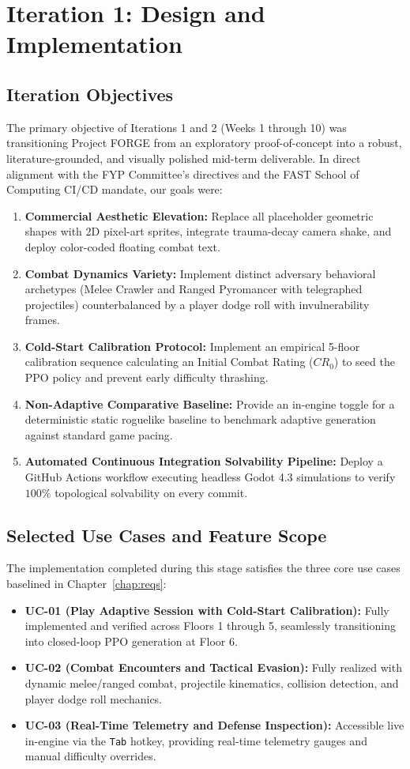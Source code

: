 \chapter{Iteration 1: Design and Implementation}
\label{chap:iter1}

\section{Iteration Objectives}
The primary objective of Iterations 1 and 2 (Weeks 1 through 10) was transitioning Project FORGE from an exploratory proof-of-concept into a robust, literature-grounded, and visually polished mid-term deliverable. In direct alignment with the FYP Committee's directives and the FAST School of Computing CI/CD mandate, our goals were:
\begin{enumerate}
    \item \textbf{Commercial Aesthetic Elevation:} Replace all placeholder geometric shapes with 2D pixel-art sprites, integrate trauma-decay camera shake, and deploy color-coded floating combat text.
    \item \textbf{Combat Dynamics Variety:} Implement distinct adversary behavioral archetypes (Melee Crawler and Ranged Pyromancer with telegraphed projectiles) counterbalanced by a player dodge roll with invulnerability frames.
    \item \textbf{Cold-Start Calibration Protocol:} Implement an empirical 5-floor calibration sequence calculating an Initial Combat Rating ($CR_0$) to seed the PPO policy and prevent early difficulty thrashing.
    \item \textbf{Non-Adaptive Comparative Baseline:} Provide an in-engine toggle for a deterministic static roguelike baseline to benchmark adaptive generation against standard game pacing.
    \item \textbf{Automated Continuous Integration Solvability Pipeline:} Deploy a GitHub Actions workflow executing headless Godot 4.3 simulations to verify $100\%$ topological solvability on every commit.
\end{enumerate}

\section{Selected Use Cases and Feature Scope}
The implementation completed during this stage satisfies the three core use cases baselined in Chapter~\ref{chap:reqs}:
\begin{itemize}
    \item \textbf{UC-01 (Play Adaptive Session with Cold-Start Calibration):} Fully implemented and verified across Floors 1 through 5, seamlessly transitioning into closed-loop PPO generation at Floor 6.
    \item \textbf{UC-02 (Combat Encounters and Tactical Evasion):} Fully realized with dynamic melee/ranged combat, projectile kinematics, collision detection, and player dodge roll mechanics.
    \item \textbf{UC-03 (Real-Time Telemetry and Defense Inspection):} Accessible live in-engine via the \texttt{Tab} hotkey, providing real-time telemetry gauges and manual difficulty overrides.
\end{itemize}

